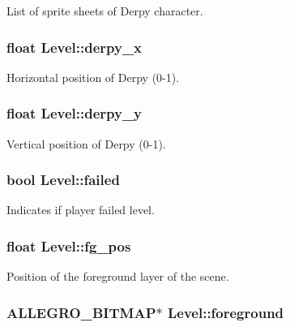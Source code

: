 \-List of sprite sheets of \-Derpy character. \hypertarget{structLevel_ae5a97d5b61c70c63e93992a9ff3935f9}{
\subsubsection[{derpy\-\_\-x}]{\setlength{\rightskip}{0pt plus 5cm}float {\bf \-Level\-::derpy\-\_\-x}}}\label{structLevel_ae5a97d5b61c70c63e93992a9ff3935f9}
\-Horizontal position of \-Derpy (0-\/1). \hypertarget{structLevel_a7b3c0f5af134797a1ed21ef48da3ab00}{
\subsubsection[{derpy\-\_\-y}]{\setlength{\rightskip}{0pt plus 5cm}float {\bf \-Level\-::derpy\-\_\-y}}}\label{structLevel_a7b3c0f5af134797a1ed21ef48da3ab00}
\-Vertical position of \-Derpy (0-\/1). \hypertarget{structLevel_a5bea34b31777260f1b23a1d64e6cd865}{
\subsubsection[{failed}]{\setlength{\rightskip}{0pt plus 5cm}bool {\bf \-Level\-::failed}}}\label{structLevel_a5bea34b31777260f1b23a1d64e6cd865}
\-Indicates if player failed level. \hypertarget{structLevel_a665bb93951ab6b7a91543712152a3acf}{
\subsubsection[{fg\-\_\-pos}]{\setlength{\rightskip}{0pt plus 5cm}float {\bf \-Level\-::fg\-\_\-pos}}}\label{structLevel_a665bb93951ab6b7a91543712152a3acf}
\-Position of the foreground layer of the scene. \hypertarget{structLevel_a26c758ccdc7404a3ee0e766d1cbbf0be}{
\subsubsection[{foreground}]{\setlength{\rightskip}{0pt plus 5cm}\-A\-L\-L\-E\-G\-R\-O\-\_\-\-B\-I\-T\-M\-A\-P$\ast$ {\bf \-Level\-::foreground}}}\label{structLevel_a26c758ccdc7404a3ee0e766d1cbbf0be}
